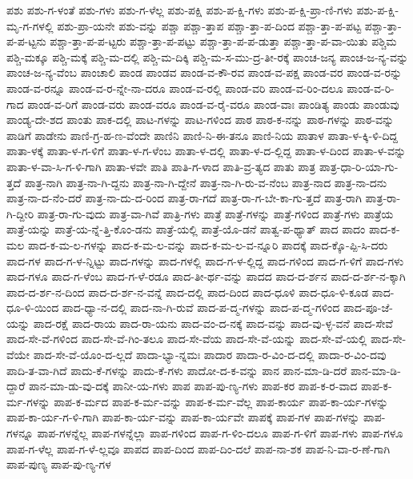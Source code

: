{ಪಶು
ಪಶು-ಗ-ಳಂತೆ
ಪಶು-ಗಳು
ಪಶು-ಗ-ಳೆಲ್ಲ
ಪಶು-ಪಕ್ಷಿ
ಪಶು-ಪ-ಕ್ಷಿ-ಗಳು
ಪಶು-ಪ-ಕ್ಷಿ-ಪ್ರಾ-ಣಿ-ಗಳು
ಪಶು-ಪ-ಕ್ಷಿ-ಮೃ-ಗ-ಗಳಲ್ಲಿ
ಪಶು-ಪ್ರಾ-ಯನೇ
ಪಶು-ವನ್ನು
ಪಶ್ಚಾ
ಪಶ್ಚಾ-ತ್ತಾಪ
ಪಶ್ಚಾ-ತ್ತಾ-ಪ-ದಿಂದ
ಪಶ್ಚಾ-ತ್ತಾ-ಪ-ಪಟ್ಟ
ಪಶ್ಚಾ-ತ್ತಾ-ಪ-ಪ-ಟ್ಟನು
ಪಶ್ಚಾ-ತ್ತಾ-ಪ-ಪ-ಟ್ಟರು
ಪಶ್ಚಾ-ತ್ತಾ-ಪ-ಪಟ್ಟು
ಪಶ್ಚಾ-ತ್ತಾ-ಪ-ಪ-ಡುತ್ತಾ
ಪಶ್ಚಾ-ತ್ತಾ-ಪ-ವಾ-ಯಿತು
ಪಶ್ಚಿಮ
ಪಶ್ಚಿ-ಮಕ್ಕೂ
ಪಶ್ಚಿ-ಮಕ್ಕೆ
ಪಶ್ಚಿ-ಮ-ದಲ್ಲಿ
ಪಶ್ಚಿ-ಮ-ದಿಕ್ಕಿ
ಪಶ್ಚಿ-ಮ-ಸ-ಮು-ದ್ರ-ತೀ-ರಕ್ಕೆ
ಪಾಂಚ-ಜನ್ಯ
ಪಾಂಚ-ಜ-ನ್ಯ-ವನ್ನು
ಪಾಂಚ-ಜ-ನ್ಯ-ವೆಂಬ
ಪಾಂಚಾಲಿ
ಪಾಂಡ
ಪಾಂಡವ
ಪಾಂಡ-ವ-ಕೌ-ರವ
ಪಾಂಡ-ವ-ಪಕ್ಷ
ಪಾಂಡ-ವರ
ಪಾಂಡ-ವ-ರನ್ನು
ಪಾಂಡ-ವ-ರನ್ನೂ
ಪಾಂಡ-ವ-ರ-ನ್ನೇ-ನಾ-ದರೂ
ಪಾಂಡ-ವ-ರಲ್ಲಿ
ಪಾಂಡ-ವರಿ
ಪಾಂಡ-ವ-ರಿಂ-ದಲೂ
ಪಾಂಡ-ವ-ರಿ-ಗಾದ
ಪಾಂಡ-ವ-ರಿಗೆ
ಪಾಂಡ-ವರು
ಪಾಂಡ-ವರೂ
ಪಾಂಡ-ವ-ರೈ-ವರೂ
ಪಾಂಡ-ವಾಃ
ಪಾಂಡಿತ್ಯ
ಪಾಂಡು
ಪಾಂಡುವು
ಪಾಂಡ್ಯ-ದೇ-ಶದ
ಪಾಂತು
ಪಾಕ-ದಲ್ಲಿ
ಪಾಟ-ಗಳನ್ನು
ಪಾಟ-ಗಳಿಂದ
ಪಾಠ
ಪಾಠ-ಕ-ನನ್ನು
ಪಾಠ-ಗಳನ್ನು
ಪಾಠ-ವನ್ನು
ಪಾಡಿಗೆ
ಪಾಡೇನು
ಪಾಣಿ-ಗ್ರ-ಹ-ಣ-ವೆಂದೇ
ಪಾಣಿನಿ
ಪಾಣಿ-ನಿ-ಈ-ತನೂ
ಪಾಣಿ-ನಿಯ
ಪಾತಾಳ
ಪಾತಾ-ಳ-ಕ್ಕಿ-ಳಿ-ದಿದ್ದ
ಪಾತಾ-ಳಕ್ಕೆ
ಪಾತಾ-ಳ-ಗ-ಳಿಗೆ
ಪಾತಾ-ಳ-ಗ-ಳೆಂಬ
ಪಾತಾ-ಳ-ದಲ್ಲಿ
ಪಾತಾ-ಳ-ದ-ಲ್ಲಿದ್ದ
ಪಾತಾ-ಳ-ದಿಂದ
ಪಾತಾ-ಳ-ವನ್ನು
ಪಾತಾ-ಳ-ವಾ-ಸಿ-ಗ-ಳಿ-ಗಾಗಿ
ಪಾತಾ-ಳವೇ
ಪಾತಿ
ಪಾತಿ-ಗ-ಳಾದ
ಪಾತಿ-ವ್ರ-ತ್ಯದ
ಪಾತು
ಪಾತ್ರ
ಪಾತ್ರ-ಧಾ-ರಿ-ಯಾ-ಗು-ತ್ತದೆ
ಪಾತ್ರ-ನಾಗಿ
ಪಾತ್ರ-ನಾ-ಗಿ-ದ್ದನು
ಪಾತ್ರ-ನಾ-ಗಿ-ದ್ದೇನೆ
ಪಾತ್ರ-ನಾ-ಗಿ-ರು-ವ-ನೆಂಬ
ಪಾತ್ರ-ನಾದ
ಪಾತ್ರ-ನಾ-ದನು
ಪಾತ್ರ-ನಾ-ದ-ನೆಂ-ದರೆ
ಪಾತ್ರ-ನಾ-ದು-ದ-ರಿಂದ
ಪಾತ್ರ-ರಾ-ಗದೆ
ಪಾತ್ರ-ರಾ-ಗ-ಬೇ-ಕಾ-ಗು-ತ್ತದೆ
ಪಾತ್ರ-ರಾಗಿ
ಪಾತ್ರ-ರಾ-ಗಿ-ದ್ದೀರಿ
ಪಾತ್ರ-ರಾ-ಗು-ವುದು
ಪಾತ್ರ-ವಾ-ಗಿವೆ
ಪಾತ್ರಿ-ಗಳು
ಪಾತ್ರೆ
ಪಾತ್ರೆ-ಗಳನ್ನು
ಪಾತ್ರೆ-ಗಳಿಂದ
ಪಾತ್ರೆ-ಗಳು
ಪಾತ್ರೆಯ
ಪಾತ್ರೆ-ಯನ್ನು
ಪಾತ್ರೆ-ಯ-ನ್ನೆ-ತ್ತಿ-ಕೊಂ-ಡನು
ಪಾತ್ರೆ-ಯಲ್ಲಿ
ಪಾತ್ರೆ-ಯೊ-ಡನೆ
ಪಾತ್ವ-ಪ-ಥ್ಯಾತ್
ಪಾದ
ಪಾದಂ
ಪಾದ-ಕ-ಮಲ
ಪಾದ-ಕ-ಮ-ಲ-ಗಳನ್ನು
ಪಾದ-ಕ-ಮ-ಲ-ವನ್ನು
ಪಾದ-ಕ-ಮ-ಲ-ವ-ನ್ನೂರಿ
ಪಾದಕ್ಕೆ
ಪಾದ-ಕ್ಕೊ-ಪ್ಪಿ-ಸಿ-ದರು
ಪಾದ-ಗಳ
ಪಾದ-ಗ-ಳ-ನ್ನಿಟ್ಟು
ಪಾದ-ಗಳನ್ನು
ಪಾದ-ಗಳಲ್ಲಿ
ಪಾದ-ಗ-ಳ-ಲ್ಲಿದ್ದ
ಪಾದ-ಗಳಿಂದ
ಪಾದ-ಗ-ಳಿಗೆ
ಪಾದ-ಗಳು
ಪಾದ-ಗಳೂ
ಪಾದ-ಗ-ಳೆಂಬ
ಪಾದ-ಗ-ಳೆ-ರಡೂ
ಪಾದ-ತೀ-ರ್ಥ-ವನ್ನು
ಪಾದದ
ಪಾದ-ದ-ರ್ಶನ
ಪಾದ-ದ-ರ್ಶ-ನ-ಕ್ಕಾಗಿ
ಪಾದ-ದ-ರ್ಶ-ನ-ದಿಂದ
ಪಾದ-ದ-ರ್ಶ-ನ-ವನ್ನೆ
ಪಾದ-ದಲ್ಲಿ
ಪಾದ-ದಿಂದ
ಪಾದ-ಧೂಳಿ
ಪಾದ-ಧೂ-ಳಿ-ಕೂಡ
ಪಾದ-ಧೂ-ಳಿ-ಯಿಂದ
ಪಾದ-ಧ್ಯಾ-ನ-ದಲ್ಲಿ
ಪಾದ-ನಾ-ಗಿ-ರುವೆ
ಪಾದ-ಪ-ದ್ಮ-ಗಳನ್ನು
ಪಾದ-ಪ-ದ್ಮ-ಗಳಿಂದ
ಪಾದ-ಪೂ-ಜೆ-ಯನ್ನು
ಪಾದ-ರಕ್ಷೆ
ಪಾದ-ರಾಯ
ಪಾದ-ರಾ-ಯನು
ಪಾದ-ವಂ-ದ-ನಕ್ಕೆ
ಪಾದ-ವನ್ನು
ಪಾದ-ವು-ಳ್ಳ-ವನೆ
ಪಾದ-ಸೇವೆ
ಪಾದ-ಸೇ-ವೆ-ಗಳಿಂದ
ಪಾದ-ಸೇ-ವೆ-ಗಿಂ-ತಲೂ
ಪಾದ-ಸೇ-ವೆಯ
ಪಾದ-ಸೇ-ವೆ-ಯನ್ನು
ಪಾದ-ಸೇ-ವೆ-ಯಲ್ಲಿ
ಪಾದ-ಸೇ-ವೆಯೇ
ಪಾದ-ಸೇ-ವೆ-ಯೊಂ-ದ-ಲ್ಲದೆ
ಪಾದಾ-ಭ್ಯಾ-ನ್ನಮಃ
ಪಾದಾರ
ಪಾದಾ-ರ-ವಿಂ-ದ-ದಲ್ಲಿ
ಪಾದಾ-ರ-ವಿಂ-ದವು
ಪಾದಿ-ತ-ವಾ-ಗಿದೆ
ಪಾದು-ಕೆ-ಗಳನ್ನು
ಪಾದು-ಕೆ-ಗಳು
ಪಾದೋ-ದ-ಕ-ವನ್ನು
ಪಾನ
ಪಾನ-ಮಾ-ಡಿ-ದರೆ
ಪಾನ-ಮಾ-ಡಿ-ದ್ದಾರೆ
ಪಾನ-ಮಾ-ಡು-ವು-ದಕ್ಕೆ
ಪಾನೀ-ಯ-ಗಳು
ಪಾಪ
ಪಾಪ-ಪು-ಣ್ಯ-ಗಳು
ಪಾಪ-ಕರ
ಪಾಪ-ಕ-ರ-ವಾದ
ಪಾಪ-ಕ-ರ್ಮ-ಗಳನ್ನು
ಪಾಪ-ಕ-ರ್ಮದ
ಪಾಪ-ಕ-ರ್ಮ-ವನ್ನು
ಪಾಪ-ಕ-ರ್ಮ-ವೆಲ್ಲ
ಪಾಪ-ಕಾರ್ಯ
ಪಾಪ-ಕಾ-ರ್ಯ-ಗಳನ್ನು
ಪಾಪ-ಕಾ-ರ್ಯ-ಗ-ಳಿ-ಗಾಗಿ
ಪಾಪ-ಕಾ-ರ್ಯ-ವನ್ನು
ಪಾಪ-ಕಾ-ರ್ಯವೇ
ಪಾಪಕ್ಕೆ
ಪಾಪ-ಗಳ
ಪಾಪ-ಗಳನ್ನು
ಪಾಪ-ಗಳನ್ನೂ
ಪಾಪ-ಗಳನ್ನೆಲ್ಲ
ಪಾಪ-ಗಳನ್ನೆಲ್ಲಾ
ಪಾಪ-ಗಳಿಂದ
ಪಾಪ-ಗ-ಳಿಂ-ದಲೂ
ಪಾಪ-ಗ-ಳಿಗೆ
ಪಾಪ-ಗಳು
ಪಾಪ-ಗಳೂ
ಪಾಪ-ಗ-ಳೆಲ್ಲ
ಪಾಪ-ಗ-ಳೆ-ಲ್ಲವೂ
ಪಾಪದ
ಪಾಪ-ದಿಂದ
ಪಾಪ-ದಿಂ-ದಲೆ
ಪಾಪ-ನಾ-ಶಕ
ಪಾಪ-ನಿ-ವಾ-ರ-ಣೆ-ಗಾಗಿ
ಪಾಪ-ಪುಣ್ಯ
ಪಾಪ-ಪು-ಣ್ಯ-ಗಳ
}
